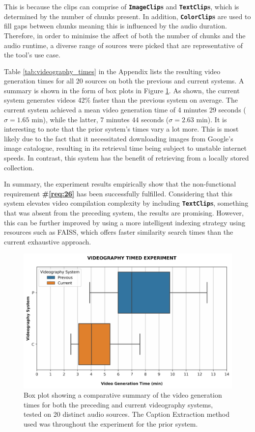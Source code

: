 \documentclass{l4proj}
\begin{document}
This is because the clips can comprise of \textbf{\lstinline|ImageClip|s} and \textbf{\lstinline|TextClip|s}, which is determined by the number of chunks present. In addition, \textbf{\lstinline|ColorClip|s} are used to fill gaps between chunks meaning this is influenced by the audio duration. Therefore, in order to minimise the affect of both the number of chunks and the audio runtime, a diverse range of sources were picked that are representative of the tool's use case. 

Table \ref{tab:videography_times} in the Appendix lists the resulting video generation times for all 20 sources on both the previous and current systems. A summary is shown in the form of box plots in Figure \ref{fig:videography_timed}. As shown, the current system generates videos
42\% faster than the previous system on average. The current system achieved a mean video generation time of 4 minutes 29 seconds ($\sigma = 1.65$ min), while the latter, 7 minutes 44 seconds ($\sigma = 2.63$ min). It is interesting to note that the prior system's times vary a lot more. This is most likely due to the fact that it necessitated downloading images from Google's image catalogue, resulting in its retrieval time being subject to unstable internet speeds. In contrast, this system has the benefit of retrieving from a locally stored collection.

In summary, the experiment results empirically show that the non-functional requirement \textbf{\#\ref{req:26}} has been successfully fulfilled. Considering that this system elevates video compilation complexity by including \textbf{\lstinline|TextClip|s}, something that was absent from the preceding system, the results are promising. However, this can be further improved by using a more intelligent indexing strategy using resources such as FAISS, which offers faster similarity search times than the current exhaustive approach.

\begin{figure}
    \centering
    \includegraphics[width=1\textwidth]{figures/videography_timed_experiment.pdf}
    \caption{Box plot showing a comparative summary of the video generation times for both the preceding and current videography systems, tested on 20 distinct audio sources. The Caption Extraction method used was throughout the experiment for the prior system.}
    \label{fig:videography_timed}
\end{figure}
\end{document}

